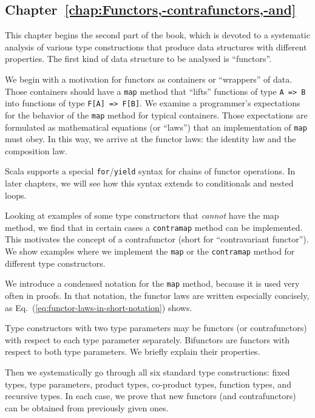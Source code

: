 \subsection{Chapter~\ref{chap:Functors,-contrafunctors,-and}}

This chapter begins the second part of the book, which is devoted
to a systematic analysis of various type constructions that produce
data structures with different properties. The first kind of data
structure to be analysed is \textsf{``}functors\textsf{''}.

We begin with a motivation for functors as containers or \textsf{``}wrappers\textsf{''}
of data. Those containers should have a \lstinline!map! method that
\textsf{``}lifts\textsf{''} functions of type \lstinline!A => B! into functions of
type \lstinline!F[A] => F[B]!. We examine a programmer\textsf{'}s expectations
for the behavior of the \lstinline!map! method for typical containers.
Those expectations are formulated as mathematical equations (or \textsf{``}laws\textsf{''})
that an implementation of \lstinline!map! must obey. In this way,
we arrive at the functor laws: the identity law and the composition
law.

Scala supports a special \lstinline!for!/\lstinline!yield! syntax
for chains of functor operations. In later chapters, we will see how
this syntax extends to conditionals and nested loops.

Looking at examples of some type constructors that \emph{cannot} have
the map method, we find that in certain cases a \lstinline!contramap!
method can be implemented. This motivates the concept of a contrafunctor
(short for \textsf{``}contravariant functor\textsf{''}). We show examples where we
implement the \lstinline!map! or the \lstinline!contramap! method
for different type constructors.

We introduce a condensed notation for the \lstinline!map! method,
because it is used very often in proofs. In that notation, the functor
laws are written especially concisely, as Eq.~(\ref{eq:functor-laws-in-short-notation})
shows.

Type constructors with two type parameters may be functors (or contrafunctors)
with respect to each type parameter separately. Bifunctors are functors
with respect to both type parameters. We briefly explain their properties.

Then we systematically go through all six standard type constructions:
fixed types, type parameters, product types, co-product types, function
types, and recursive types. In each case, we prove that new functors
(and contrafunctors) can be obtained from previously given ones. 

